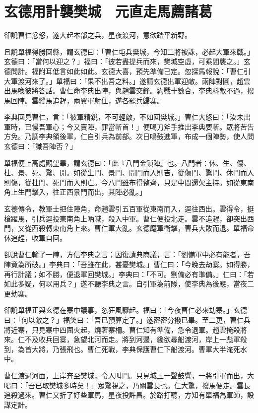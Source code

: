 
\chapter{玄德用計襲樊城　元直走馬薦諸葛}

卻說曹仁忿怒，遂大起本部之兵，星夜渡河，意欲踏平新野。

且說單福得勝回縣，謂玄德曰：「曹仁屯兵樊城，今知二將被誅，必起大軍來戰。」玄德曰：「當何以迎之？」福曰：「彼若盡提兵而來，樊城空虛，可乘間襲之。」玄德問計。福附耳低言如此如此。玄德大喜，預先準備已定。忽探馬報說：「曹仁引大軍渡河來了。」單福曰：「果不出吾之料。」遂請玄德出軍迎敵。兩陣對圓，趙雲出馬喚彼將答話。曹仁命李典出陣，與趙雲交鋒。約戰十數合，李典料敵不過，撥馬回陣。雲縱馬追趕，兩翼軍射住，遂各罷兵歸寨。

李典回見曹仁，言：「彼軍精銳，不可輕敵，不如回樊城。」曹仁大怒曰：「汝未出軍時，已慢吾軍心；今又賣陣，罪當斬首！」便喝刀斧手推出李典要斬。眾將苦告方免。乃調李典領後軍，仁自引兵為前部。次日鳴鼓進軍，布成一個陣勢，使人問玄德曰：「識吾陣否？」

單福便上高處觀望畢，謂玄德曰：「此『八門金鎖陣』也。八門者：休、生、傷、杜、景、死、驚、開。如從生門、景門、開門而入則吉，從傷門、驚門、休門而入則傷，從杜門、死門而入則亡。今八門雖布得整齊，只是中間還欠主持。如從東南角上生門擊入，往正西景門而出，其陣必亂。」

玄德傳令，教軍士把住陣角，命趙雲引五百軍從東南而入，逕往西出。雲得令，挺槍躍馬，引兵逕投東南角上吶喊，殺入中軍。曹仁便投北走。雲不追趕，卻突出西門，又從西殺轉東南角上來。曹仁軍大亂。玄德麾軍衝擊，曹兵大敗而退。單福命休追趕，收軍自回。

卻說曹仁輸了一陣，方信李典之言；因復請典商議，言：「劉備軍中必有能者，吾陣竟為所破。」李典曰：「吾雖在此，甚憂樊城。」曹仁曰：「今晚去劫寨。如得勝，再行計議；如不勝，便退軍回樊城。」李典曰：「不可。劉備必有準備。」仁曰：「若如此多疑，何以用兵？」遂不聽李典之言。自引軍為前隊，使李典為後應，當夜二更劫寨。

卻說單福正與玄德在寨中議事，忽狂風驟起。福曰：「今夜曹仁必來劫寨。」玄德曰：「何以敵之？」福笑曰：「吾已預算定了。」遂密密分撥已畢。至二更，曹仁兵將近寨，只見寨中四圍火起，燒著寨柵。曹仁知有準備，急令退軍。趙雲掩殺將來。仁不及收兵回寨，急望北河而走。將到河邊，纔欲尋船渡河，岸上一彪軍殺到，為首大將，乃張飛也。曹仁死戰，李典保護曹仁下船渡河。曹軍大半淹死水中。

曹仁渡過河面，上岸奔至樊城，令人叫門。只見城上一聲鼓響，一將引軍而出，大喝曰：「吾已取樊城多時矣！」眾驚視之，乃關雲長也。仁大驚，撥馬便走。雲長追殺過來。曹仁又折了好些軍馬，星夜投許昌。於路打聽，方知有單福為軍師，設謀定計。

